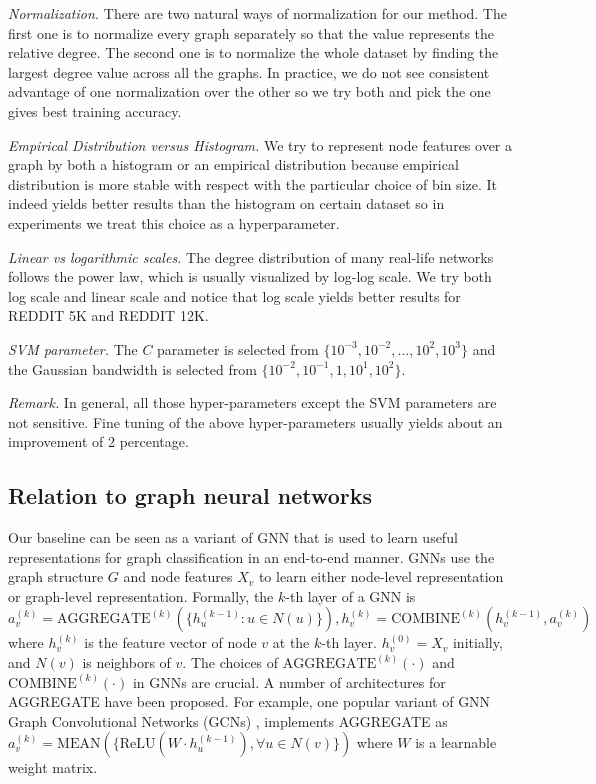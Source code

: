 \documentclass[11pt,onecolumn]{article}
\begin{document}
\emph{Normalization.}  There are two natural ways of normalization for our method. The first one is to normalize every graph separately so that the value represents the relative degree. The second one is to normalize the whole dataset by finding the largest degree value across all the graphs. In practice, we do not see consistent advantage of one normalization over the other so we try both and pick the one gives best training accuracy.

\emph{Empirical Distribution versus Histogram.} We try to represent node features over a graph by both a histogram or an empirical distribution because empirical distribution is more stable with respect with the particular choice of bin size. It indeed yields better results than the histogram on certain dataset so in experiments we treat this choice as a hyperparameter. 

\emph{Linear vs logarithmic scales.} The degree distribution of many real-life networks follows the power law, which is usually visualized by log-log scale. We try both log scale and linear scale and notice that log scale yields better results for REDDIT 5K and REDDIT 12K. 

\emph{SVM parameter.} The $C$ parameter is selected from $\{10^{-3}, 10^{-2}, ..., 10^{2}, 10^{3}\}$ and the Gaussian bandwidth is selected from $\{10^{-2}, 10^{-1}, 1, 10^{1}, 10^{2}\}$. 

\emph{Remark.} In general, all those hyper-parameters except the SVM parameters are not sensitive.  Fine tuning of the above hyper-parameters usually yields about an improvement of 2 percentage. 


\subsection{Relation to graph neural networks }
Our baseline can be seen as a variant of GNN that is used to learn useful representations for graph classification in an end-to-end manner.  GNNs use the graph structure $G$ and node features $X_{v}$ to learn either node-level representation or graph-level representation. Formally, the $k$-th layer of a GNN is
\begin{equation}
a_{v}^{(k)} = \text{AGGREGATE}^{(k)}(\{ h_{u}^{(k-1)} : u \in N(u) \}), h_{v}^{(k)} = \text{COMBINE}^{(k)}(h_{v}^{(k-1)}, a_v^{(k)})
\end{equation}
where $h_{v}^{(k)}$ is the feature vector of node $v$ at the $k$-th layer. $h_v^{(0)} = X_v$ initially, and $N(v)$ is neighbors of $v$. The choices of $\text{AGGREGATE}^{(k)}(\cdot) $ and $\text{COMBINE}^{(k)}(\cdot)$ in GNNs are crucial. A number of architectures for AGGREGATE have been proposed. For example, one popular variant of GNN Graph Convolutional Networks (GCNs) \cite{kipf2016semi}, implements AGGREGATE as
$a_v^{(k)} = \text{MEAN}(\{ \text{ReLU}(W \cdot h_u^{(k-1)}), \forall u \in N(v)  \})$
where $W$ is a learnable weight matrix. 
\end{document}

